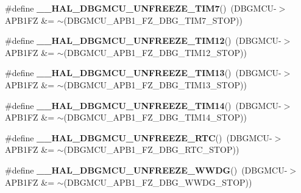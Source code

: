 \begin{DoxyCompactItemize}
\item 
\mbox{\label{group___h_a_l___exported___macros_ga4a6c5081b976583921ac5d140e15bb85}} 
\#define {\bfseries \+\_\+\+\_\+\+H\+A\+L\+\_\+\+D\+B\+G\+M\+C\+U\+\_\+\+U\+N\+F\+R\+E\+E\+Z\+E\+\_\+\+T\+I\+M7}()~(D\+B\+G\+M\+CU-\/$>$A\+P\+B1\+FZ \&= $\sim$(D\+B\+G\+M\+C\+U\+\_\+\+A\+P\+B1\+\_\+\+F\+Z\+\_\+\+D\+B\+G\+\_\+\+T\+I\+M7\+\_\+\+S\+T\+OP))
\item 
\mbox{\label{group___h_a_l___exported___macros_gaa8e882be8db24537679bc0d4a129f448}} 
\#define {\bfseries \+\_\+\+\_\+\+H\+A\+L\+\_\+\+D\+B\+G\+M\+C\+U\+\_\+\+U\+N\+F\+R\+E\+E\+Z\+E\+\_\+\+T\+I\+M12}()~(D\+B\+G\+M\+CU-\/$>$A\+P\+B1\+FZ \&= $\sim$(D\+B\+G\+M\+C\+U\+\_\+\+A\+P\+B1\+\_\+\+F\+Z\+\_\+\+D\+B\+G\+\_\+\+T\+I\+M12\+\_\+\+S\+T\+OP))
\item 
\mbox{\label{group___h_a_l___exported___macros_ga00b605f660d43ab1b833926dabe352fe}} 
\#define {\bfseries \+\_\+\+\_\+\+H\+A\+L\+\_\+\+D\+B\+G\+M\+C\+U\+\_\+\+U\+N\+F\+R\+E\+E\+Z\+E\+\_\+\+T\+I\+M13}()~(D\+B\+G\+M\+CU-\/$>$A\+P\+B1\+FZ \&= $\sim$(D\+B\+G\+M\+C\+U\+\_\+\+A\+P\+B1\+\_\+\+F\+Z\+\_\+\+D\+B\+G\+\_\+\+T\+I\+M13\+\_\+\+S\+T\+OP))
\item 
\mbox{\label{group___h_a_l___exported___macros_gaa62a0abc610b769d15fd9d20bdc14cd7}} 
\#define {\bfseries \+\_\+\+\_\+\+H\+A\+L\+\_\+\+D\+B\+G\+M\+C\+U\+\_\+\+U\+N\+F\+R\+E\+E\+Z\+E\+\_\+\+T\+I\+M14}()~(D\+B\+G\+M\+CU-\/$>$A\+P\+B1\+FZ \&= $\sim$(D\+B\+G\+M\+C\+U\+\_\+\+A\+P\+B1\+\_\+\+F\+Z\+\_\+\+D\+B\+G\+\_\+\+T\+I\+M14\+\_\+\+S\+T\+OP))
\item 
\mbox{\label{group___h_a_l___exported___macros_ga3d85d5cda1979c7df426634a1d3d7d35}} 
\#define {\bfseries \+\_\+\+\_\+\+H\+A\+L\+\_\+\+D\+B\+G\+M\+C\+U\+\_\+\+U\+N\+F\+R\+E\+E\+Z\+E\+\_\+\+R\+TC}()~(D\+B\+G\+M\+CU-\/$>$A\+P\+B1\+FZ \&= $\sim$(D\+B\+G\+M\+C\+U\+\_\+\+A\+P\+B1\+\_\+\+F\+Z\+\_\+\+D\+B\+G\+\_\+\+R\+T\+C\+\_\+\+S\+T\+OP))
\item 
\mbox{\label{group___h_a_l___exported___macros_gaa14c8a2e8911976b8c8ce6ca278372a2}} 
\#define {\bfseries \+\_\+\+\_\+\+H\+A\+L\+\_\+\+D\+B\+G\+M\+C\+U\+\_\+\+U\+N\+F\+R\+E\+E\+Z\+E\+\_\+\+W\+W\+DG}()~(D\+B\+G\+M\+CU-\/$>$A\+P\+B1\+FZ \&= $\sim$(D\+B\+G\+M\+C\+U\+\_\+\+A\+P\+B1\+\_\+\+F\+Z\+\_\+\+D\+B\+G\+\_\+\+W\+W\+D\+G\+\_\+\+S\+T\+OP))

\end{DoxyCompactItemize}
